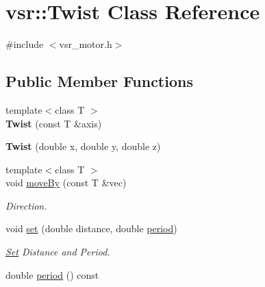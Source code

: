 \hypertarget{classvsr_1_1_twist}{\section{vsr\-:\-:Twist Class Reference}
\label{classvsr_1_1_twist}
}


{\ttfamily \#include $<$vsr\-\_\-motor.\-h$>$}

\subsection*{Public Member Functions}
\begin{DoxyCompactItemize}
\item 
\hypertarget{classvsr_1_1_twist_a15bf0a130d1560354e3a64802dafc266}{{\footnotesize template$<$class T $>$ }\\{\bfseries Twist} (const T \&axis)}\label{classvsr_1_1_twist_a15bf0a130d1560354e3a64802dafc266}

\item 
\hypertarget{classvsr_1_1_twist_a93215edad7912135a7736b2b1987ce45}{{\bfseries Twist} (double x, double y, double z)}\label{classvsr_1_1_twist_a93215edad7912135a7736b2b1987ce45}

\item 
\hypertarget{classvsr_1_1_twist_a78dae233418dca78373fff58a515de74}{{\footnotesize template$<$class T $>$ }\\void \hyperlink{classvsr_1_1_twist_a78dae233418dca78373fff58a515de74}{move\-By} (const T \&vec)}\label{classvsr_1_1_twist_a78dae233418dca78373fff58a515de74}

\begin{DoxyCompactList}\small\item\em Direction. \end{DoxyCompactList}\item 
\hypertarget{classvsr_1_1_twist_a8aaac7f8c5cb09a82ce4e75a664fc32a}{void \hyperlink{classvsr_1_1_twist_a8aaac7f8c5cb09a82ce4e75a664fc32a}{set} (double distance, double \hyperlink{classvsr_1_1_twist_a5b1e72c1d494d5b77894aa63a779e3b4}{period})}\label{classvsr_1_1_twist_a8aaac7f8c5cb09a82ce4e75a664fc32a}

\begin{DoxyCompactList}\small\item\em \hyperlink{classvsr_1_1_set}{Set} Distance and Period. \end{DoxyCompactList}\item 
\hypertarget{classvsr_1_1_twist_a5b1e72c1d494d5b77894aa63a779e3b4}{double \hyperlink{classvsr_1_1_twist_a5b1e72c1d494d5b77894aa63a779e3b4}{period} () const }\label{classvsr_1_1_twist_a5b1e72c1d494d5b77894aa63a779e3b4}


\end{DoxyCompactItemize}
